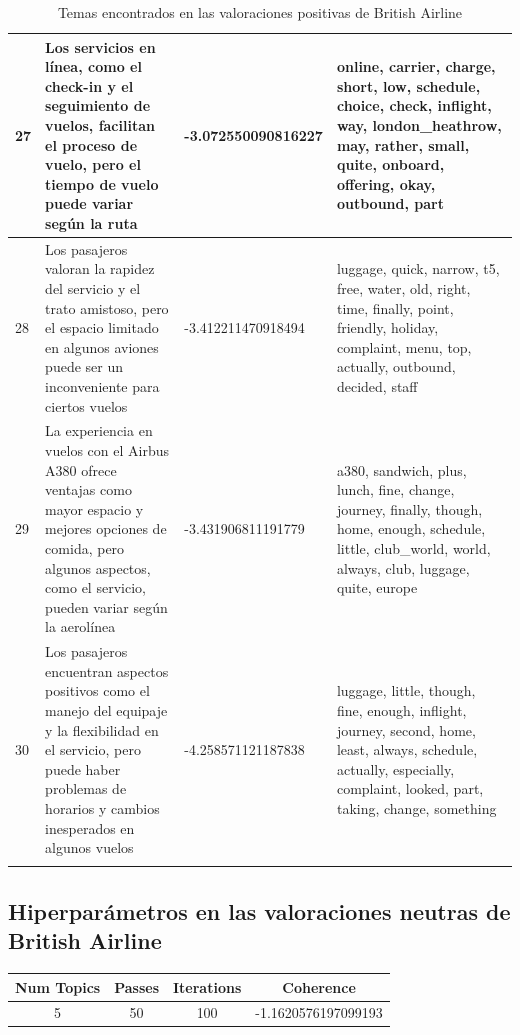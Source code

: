 \documentclass{report}
\begin{document}
{{\begin{longtable}{|p{1cm}|p{4cm}|p{4cm}|p{6cm}|}
                    27 & Los servicios en línea, como el check-in y el seguimiento de vuelos, facilitan el proceso de vuelo, pero el tiempo de vuelo puede variar según la ruta & -3.072550090816227 & online, carrier, charge, short, low, schedule, choice, check, inflight, way, london\_heathrow, may, rather, small, quite, onboard, offering, okay, outbound, part \\
                    \hline
                    28 & Los pasajeros valoran la rapidez del servicio y el trato amistoso, pero el espacio limitado en algunos aviones puede ser un inconveniente para ciertos vuelos & -3.412211470918494 & luggage, quick, narrow, t5, free, water, old, right, time, finally, point, friendly, holiday, complaint, menu, top, actually, outbound, decided, staff \\
                    \hline
                    29 & La experiencia en vuelos con el Airbus A380 ofrece ventajas como mayor espacio y mejores opciones de comida, pero algunos aspectos, como el servicio, pueden variar según la aerolínea & -3.431906811191779 & a380, sandwich, plus, lunch, fine, change, journey, finally, though, home, enough, schedule, little, club\_world, world, always, club, luggage, quite, europe \\
                    \hline
                    30 & Los pasajeros encuentran aspectos positivos como el manejo del equipaje y la flexibilidad en el servicio, pero puede haber problemas de horarios y cambios inesperados en algunos vuelos & -4.258571121187838 & luggage, little, though, fine, enough, inflight, journey, second, home, least, always, schedule, actually, especially, complaint, looked, part, taking, change, something \\
                    \hline
                    \caption{Temas encontrados en las valoraciones positivas de British Airline}
                \end{longtable}
            \clearpage\subsection{Hiperparámetros en las valoraciones neutras de British Airline}
                \label{tab:hiperparametros_british_airline_neutras}
                \begin{longtable}{|c|c|c|c|}
                    \hline
                    \textbf{Num Topics} & \textbf{Passes} & \textbf{Iterations} & \textbf{Coherence} \\
                    \hline
                    5 & 50 & 100 & -1.1620576197099193 \\

\end{longtable}}}
\end{document}
